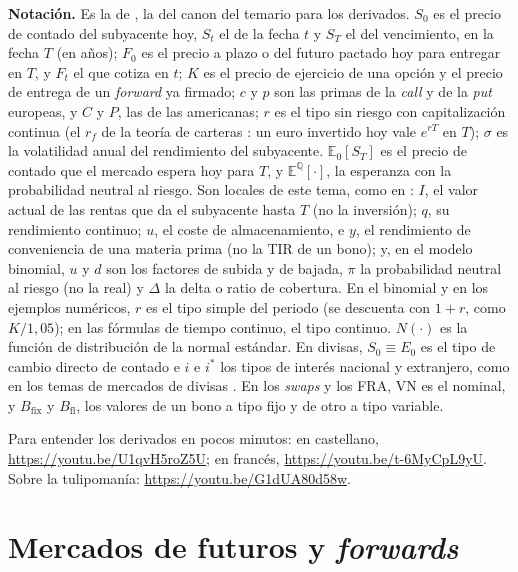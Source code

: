 \documentclass[11pt]{article}
\begin{document}
\begin{anotaciones}
\textbf{Notación.} Es la de \textcite{Hull2022Options}, la del canon del temario para los derivados. $S_0$ es el precio de contado del subyacente hoy, $S_t$ el de la fecha $t$ y $S_T$ el del vencimiento, en la fecha $T$ (en años); $F_0$ es el precio a plazo o del futuro pactado hoy para entregar en $T$, y $F_t$ el que cotiza en $t$; $K$ es el precio de ejercicio de una opción y el precio de entrega de un \emph{forward} ya firmado; $c$ y $p$ son las primas de la \emph{call} y de la \emph{put} europeas, y $C$ y $P$, las de las americanas; $r$ es el tipo sin riesgo con capitalización continua (el $r_f$ de la teoría de carteras : un euro invertido hoy vale $e^{rT}$ en $T$); $\sigma$ es la volatilidad anual del rendimiento del subyacente. $\mathbb{E}_0[S_T]$ es el precio de contado que el mercado espera hoy para $T$, y $\mathbb{E}^{\mathbb{Q}}[\cdot]$, la esperanza con la probabilidad neutral al riesgo. Son locales de este tema, como en : $I$, el valor actual de las rentas que da el subyacente hasta $T$ (no la inversión); $q$, su rendimiento continuo; $u$, el coste de almacenamiento, e $y$, el rendimiento de conveniencia de una materia prima (no la TIR de un bono); y, en el modelo binomial, $u$ y $d$ son los factores de subida y de bajada, $\pi$ la probabilidad neutral al riesgo (no la real) y $\Delta$ la delta o ratio de cobertura. En el binomial y en los ejemplos numéricos, $r$ es el tipo simple del periodo (se descuenta con $1+r$, como $K/1{,}05$); en las fórmulas de tiempo continuo, el tipo continuo. $N(\cdot)$ es la función de distribución de la normal estándar. En divisas, $S_0\equiv E_0$ es el tipo de cambio directo de contado e $i$ e $i^{*}$ los tipos de interés nacional y extranjero, como en los temas de mercados de divisas . En los \emph{swaps} y los FRA, $\mathrm{VN}$ es el nominal, y $B_{\mathrm{fix}}$ y $B_{\mathrm{fl}}$, los valores de un bono a tipo fijo y de otro a tipo variable.
\end{anotaciones}

\begin{anotaciones}
Para entender los derivados en pocos minutos: en castellano, \url{https://youtu.be/U1qvH5roZ5U}; en francés, \url{https://youtu.be/t-6MyCpL9yU}. Sobre la tulipomanía: \url{https://youtu.be/G1dUA80d58w}.
\end{anotaciones}

\section{Mercados de futuros y \emph{forwards}}\label{sec:futuros}
\end{document}
